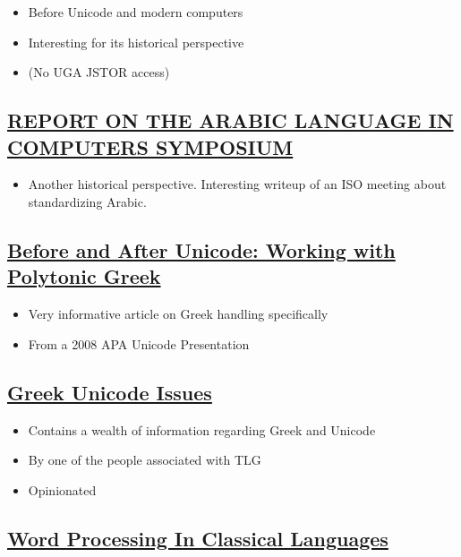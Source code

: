 \documentclass[11pt]{article}
\begin{document}
\begin{itemize}
\item Before Unicode and modern computers
\item Interesting for its historical perspective
\item (No UGA JSTOR access)
\end{itemize}

\subsection{\href{https://www.jstor.org/stable/29785130}{REPORT ON THE ARABIC LANGUAGE IN COMPUTERS SYMPOSIUM}}
\label{sec:org70726dd}

\begin{itemize}
\item Another historical perspective. Interesting writeup of an ISO meeting about standardizing Arabic.
\end{itemize}

\subsection{\href{http://ucbclassics.dreamhosters.com/djm/unicodeTalk/BeforeAndAfterUnicode.pdf}{Before and After Unicode: Working with Polytonic Greek}}
\label{sec:org26757bd}

\begin{itemize}
\item Very informative article on Greek handling specifically
\item From a 2008 APA Unicode Presentation
\end{itemize}

\subsection{\href{http://www.opoudjis.net/unicode/unicode.html}{Greek Unicode Issues}}
\label{sec:org4e14aff}

\begin{itemize}
\item Contains a wealth of information regarding Greek and Unicode
\item By one of the people associated with TLG
\item Opinionated
\end{itemize}

\subsection{\href{http://www.epea.gr/content/content/files/unicode.pdf}{Word Processing In Classical Languages}}
\label{sec:org4f263c5}
\end{document}

